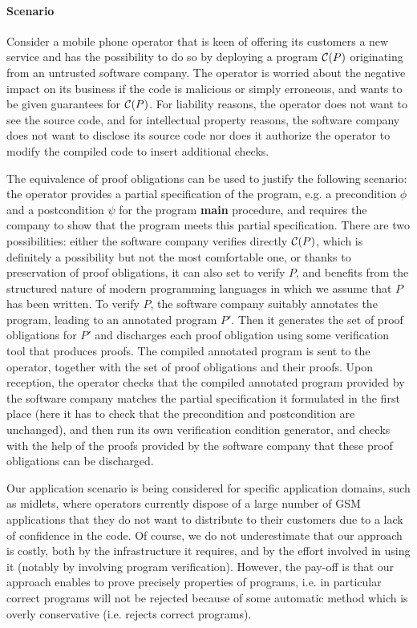 \paragraph*{Scenario}\label{subsec:scenario}
Consider a mobile phone operator that is keen of offering its
customers a new service and has the possibility to do so by deploying
a program ${\cal C}(P)$ originating from an untrusted software
company.  The operator is worried about the negative impact on its
business if the code is malicious or simply erroneous, and wants to 
be given guarantees for ${\cal C}(P)$. For liability reasons, the
operator does not want to see the source code, and for intellectual
property reasons, the software company does not want to disclose its
source code nor does it authorize the operator to modify the compiled
code to insert additional checks.

The equivalence of proof obligations can be used to justify the
following scenario: the operator provides a partial specification of
the program, e.g.  a precondition $\phi$ and a postcondition $\psi$
for the program {\bf main} procedure, and requires the company to show
that the program meets this partial specification.  There are two
possibilities: either the software company verifies directly
${\cal C}(P)$, which is definitely a possibility but not the most
comfortable one, or thanks to preservation of proof obligations, it
can also set to verify $P$, and benefits from the structured nature of
modern programming languages in which we assume that $P$ has been
written. To verify $P$, the software company suitably annotates the
program, leading to an annotated program $P'$.  Then it generates the
set of proof obligations for $P'$ and discharges each proof
obligation using some verification tool that produces proofs. The
compiled annotated program is sent to the operator, together with the
set of proof obligations and their proofs. Upon reception, the
operator checks that the compiled annotated program provided by the
software company matches the partial specification it formulated in
the first place (here it has to check that the precondition and
postcondition are unchanged), and then run its own verification
condition generator, and checks with the help of the proofs provided
by the software company that these proof obligations can be
discharged. 

Our application scenario is being considered for specific application
domains, such as midlets, where operators currently dispose of a large
number of GSM applications that they do not want to distribute to
their customers due to a lack of confidence in the code. Of course, we
do not underestimate that our approach is costly, both by the
infrastructure it requires, and by the effort involved in using it
(notably by involving program verification).  However, the pay-off is
that our approach enables to prove precisely properties of programs,
i.e. in particular correct programs will not be rejected because of
some automatic method which is overly conservative (i.e. rejects
correct programs). 


